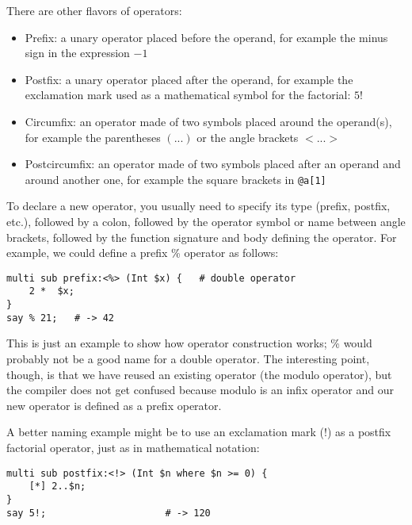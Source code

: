 There are other flavors of operators:
\begin{itemize}
\item Prefix: a unary operator placed before the operand, 
for example the minus sign in the expression $-1$

\item Postfix: a unary operator placed after the operand, 
for example the exclamation mark used as a mathematical  
symbol for the factorial: $5!$

\item Circumfix: an operator made of two symbols placed 
around the operand(s), for example the parentheses $(...)$ 
or the angle brackets $<...>$

\item Postcircumfix: an operator made of two symbols placed 
after an operand and around another one, for example the 
square brackets in \verb'@a[1]'
\end{itemize}

To declare a new operator, you usually need to specify 
its type (prefix, postfix, etc.), followed by a colon, 
followed by the operator symbol or name between angle brackets, 
followed by the function signature and body defining 
the operator. For example, we could define a prefix \% 
operator as follows:

\begin{verbatim}
multi sub prefix:<%> (Int $x) {   # double operator
    2 *  $x;
}
say % 21;   # -> 42
\end{verbatim}

This is just an example to show how operator construction works; \% would 
probably not be a good name for a double operator. The 
interesting point, though, is that we have reused an existing 
operator (the modulo operator), but the compiler does not 
get confused because modulo is an infix operator and our 
new operator is defined as a prefix operator.

A better naming example might be to use an exclamation 
mark (!) as a postfix factorial operator, just as in 
mathematical notation:

\begin{verbatim}
multi sub postfix:<!> (Int $n where $n >= 0) {
    [*] 2..$n;
}
say 5!;                     # -> 120
\end{verbatim}

